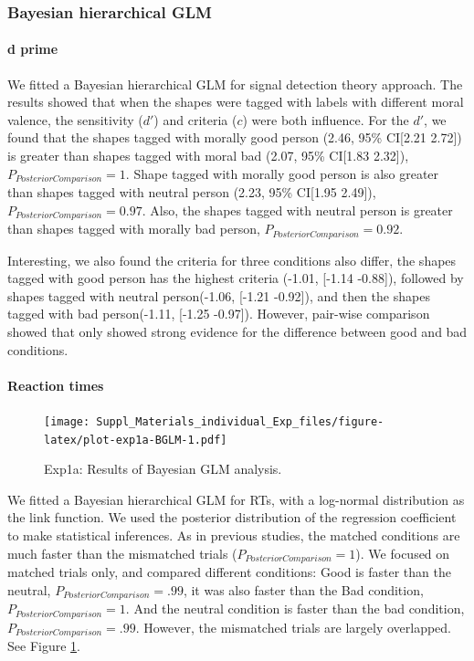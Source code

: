 \documentclass[
  english,
  man]{apa6}
\let\oldparagraph\paragraph
\renewcommand{\paragraph}[1]{\oldparagraph{#1}\mbox{}}
\begin{document}
\hypertarget{bayesian-hierarchical-glm}{%
\subsubsection{Bayesian hierarchical GLM}\label{bayesian-hierarchical-glm}}

\hypertarget{d-prime-1}{%
\paragraph{d prime}\label{d-prime-1}}

We fitted a Bayesian hierarchical GLM for signal detection theory approach. The results showed that when the shapes were tagged with labels with different moral valence, the sensitivity (\(d'\)) and criteria (\(c\)) were both influence. For the \(d'\), we found that the shapes tagged with morally good person (2.46, 95\% CI{[}2.21 2.72{]}) is greater than shapes tagged with moral bad (2.07, 95\% CI{[}1.83 2.32{]}), \(P_{PosteriorComparison} = 1\). Shape tagged with morally good person is also greater than shapes tagged with neutral person (2.23, 95\% CI{[}1.95 2.49{]}), \(P_{PosteriorComparison} = 0.97\). Also, the shapes tagged with neutral person is greater than shapes tagged with morally bad person, \(P_{PosteriorComparison} = 0.92\).

Interesting, we also found the criteria for three conditions also differ, the shapes tagged with good person has the highest criteria (-1.01, {[}-1.14 -0.88{]}), followed by shapes tagged with neutral person(-1.06, {[}-1.21 -0.92{]}), and then the shapes tagged with bad person(-1.11, {[}-1.25 -0.97{]}). However, pair-wise comparison showed that only showed strong evidence for the difference between good and bad conditions.

\hypertarget{reaction-times-1}{%
\paragraph{Reaction times}\label{reaction-times-1}}

\begin{figure}
\centering
\texttt{[image: Suppl\_Materials\_individual\_Exp\_files/figure-latex/plot-exp1a-BGLM-1.pdf]}
\caption{\label{fig:plot-exp1a-BGLM}Exp1a: Results of Bayesian GLM analysis.}
\end{figure}

We fitted a Bayesian hierarchical GLM for RTs, with a log-normal distribution as the link function. We used the posterior distribution of the regression coefficient to make statistical inferences. As in previous studies, the matched conditions are much faster than the mismatched trials (\(P_{PosteriorComparison} = 1\)). We focused on matched trials only, and compared different conditions: Good is faster than the neutral, \(P_{PosteriorComparison} = .99\), it was also faster than the Bad condition, \(P_{PosteriorComparison} = 1\). And the neutral condition is faster than the bad condition, \(P_{PosteriorComparison} = .99\). However, the mismatched trials are largely overlapped. See Figure \ref{fig:plot-exp1a-BGLM}.
\end{document}
